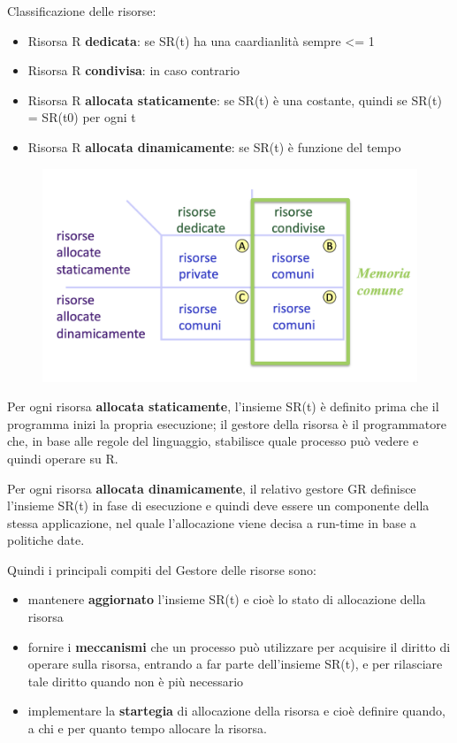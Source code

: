 \documentclass{article}
\begin{document}
Classificazione delle risorse:
\begin{itemize}
    \item Risorsa R \textbf{dedicata}: se SR(t) ha una caardianlità sempre <= 1
    \item Risorsa R \textbf{condivisa}: in caso contrario
    \item Risorsa R \textbf{allocata staticamente}: se SR(t) è una costante, quindi se SR(t) = SR(t0) per ogni t
    \item Risorsa R \textbf{allocata dinamicamente}: se SR(t) è funzione del tempo
\end{itemize}

\begin{figure}[htbp]
    \centering
    \includegraphics[width=0.50\columnwidth]{imgs/tipologie_allocazione.png}
\end{figure}

Per ogni risorsa \textbf{allocata staticamente}, l'insieme SR(t) è definito prima che il programma inizi la propria esecuzione; il gestore della risorsa è il programmatore che,
in base alle regole del linguaggio, stabilisce quale processo può vedere e quindi operare su R.


Per ogni risorsa \textbf{allocata dinamicamente}, il relativo gestore GR definisce l'insieme SR(t) in fase di esecuzione e quindi deve essere un componente della stessa applicazione,
nel quale l'allocazione viene decisa a run-time in base a politiche date.

\vspace{5mm}
Quindi i principali compiti del Gestore delle risorse sono:
\begin{itemize}
    \item mantenere \textbf{aggiornato} l'insieme SR(t) e cioè lo stato di allocazione della risorsa
    \item fornire i \textbf{meccanismi} che un processo può utilizzare per acquisire il diritto di operare sulla risorsa, entrando a far parte dell'insieme SR(t), e per rilasciare
    tale diritto quando non è più necessario
    \item implementare la \textbf{startegia} di allocazione della risorsa e cioè definire quando, a chi e per quanto tempo allocare la risorsa.
\end{itemize}
\end{document}

